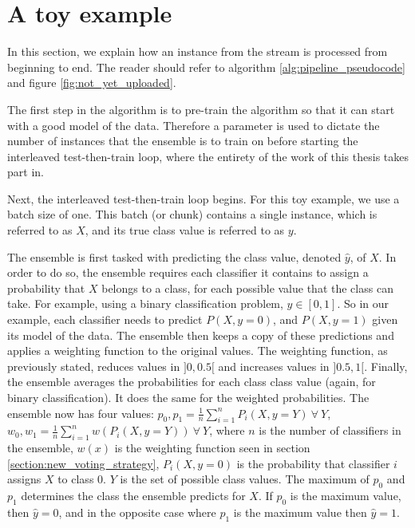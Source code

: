 
\section{A toy example}

In this section, we explain how an instance from the stream is processed from beginning to end. The reader should refer to algorithm \ref{alg:pipeline_pseudocode} and figure \ref{fig:not_yet_uploaded}.

The first step in the algorithm is to pre-train the algorithm so that it can start with a good model of the data. Therefore a parameter is used to dictate the number of instances that the ensemble is to train on before starting the interleaved test-then-train loop, where the entirety of the work of this thesis takes part in.

Next, the interleaved test-then-train loop begins. For this toy example, we use a batch size of one. This batch (or chunk) contains a single instance, which is referred to as $X$, and its true class value is referred to as $y$.

The ensemble is first tasked with predicting the class value, denoted $\hat{y}$, of $X$. In order to do so, the ensemble requires each classifier it contains to assign a probability that $X$ belongs to a class, for each possible value that the class can take. For example, using a binary classification problem, $y \in [0,1]$. So in our example, each classifier needs to predict $P(X, y=0)$, and $P(X, y=1)$ given its model of the data. The ensemble then keeps a copy of these predictions and applies a weighting function to the original values. The weighting function, as previously stated, reduces values in $]0,0.5[$ and increases values in $]0.5, 1[$. Finally, the ensemble averages the probabilities for each class class value (again, for binary classification). It does the same for the weighted probabilities. The ensemble now has four values: $p_0, p_1 = \frac{1}{n}\sum_{i=1}^{n} P_i(X, y=Y)\ \forall\ Y$,  $w_0,w_1=\frac{1}{n}\sum_{i=1}^{n} w(P_i(X, y=Y))\ \forall\ Y$, where $n$ is the number of classifiers in the ensemble, $w(x)$ is the weighting function seen in section \ref{section:new_voting_strategy}, $P_i(X, y=0)$ is the probability that classifier $i$ assigns $X$ to class $0$. $Y$ is the set of possible class values.
The maximum of $p_0$ and $p_1$ determines the class the ensemble predicts for $X$. If $p_0$ is the maximum value, then $\hat{y}=0$, and in the opposite case where $p_1$ is the maximum value then $\hat{y}=1$.


